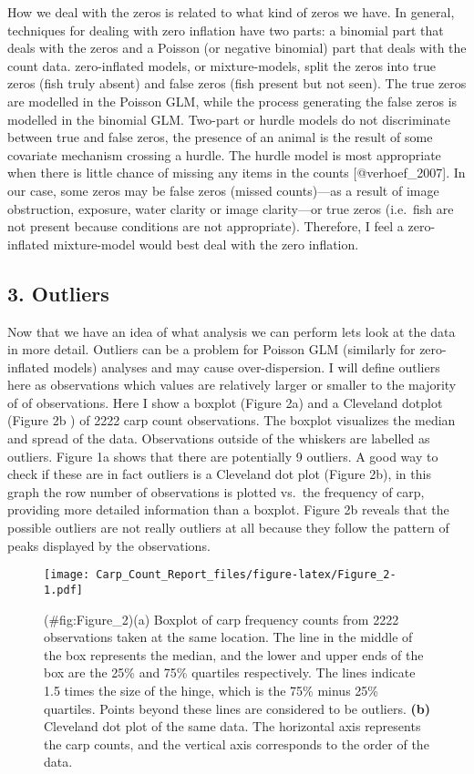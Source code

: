 \documentclass[]{article}
\begin{document}
How we deal with the zeros is related to what kind of zeros we have. In
general, techniques for dealing with zero inflation have two parts: a
binomial part that deals with the zeros and a Poisson (or negative
binomial) part that deals with the count data. zero-inflated models, or
mixture-models, split the zeros into true zeros (fish truly absent) and
false zeros (fish present but not seen). The true zeros are modelled in
the Poisson GLM, while the process generating the false zeros is
modelled in the binomial GLM. Two-part or hurdle models do not
discriminate between true and false zeros, the presence of an animal is
the result of some covariate mechanism crossing a hurdle. The hurdle
model is most appropriate when there is little chance of missing any
items in the counts {[}@verhoef\_2007{]}. In our case, some zeros may be
false zeros (missed counts)---as a result of image obstruction,
exposure, water clarity or image clarity---or true zeros (i.e.~fish are
not present because conditions are not appropriate). Therefore, I feel a
zero-inflated mixture-model would best deal with the zero inflation.

\subsection{3. Outliers}\label{outliers}

Now that we have an idea of what analysis we can perform lets look at
the data in more detail. Outliers can be a problem for Poisson GLM
(similarly for zero-inflated models) analyses and may cause
over-dispersion. I will define outliers here as observations which
values are relatively larger or smaller to the majority of of
observations. Here I show a boxplot (Figure 2a) and a Cleveland dotplot
(Figure 2b ) of 2222 carp count observations. The boxplot visualizes the
median and spread of the data. Observations outside of the whiskers are
labelled as outliers. Figure 1a shows that there are potentially 9
outliers. A good way to check if these are in fact outliers is a
Cleveland dot plot (Figure 2b), in this graph the row number of
observations is plotted vs.~the frequency of carp, providing more
detailed information than a boxplot. Figure 2b reveals that the possible
outliers are not really outliers at all because they follow the pattern
of peaks displayed by the observations.

\begin{figure}[htbp]
\centering
\texttt{[image: Carp\_Count\_Report\_files/figure-latex/Figure\_2-1.pdf]}
\caption{(\#fig:Figure\_2)(a) Boxplot of carp frequency counts from 2222
observations taken at the same location. The line in the middle of the
box represents the median, and the lower and upper ends of the box are
the 25\% and 75\% quartiles respectively. The lines indicate 1.5 times
the size of the hinge, which is the 75\% minus 25\% quartiles. Points
beyond these lines are considered to be outliers. \textbf{(b)} Cleveland
dot plot of the same data. The horizontal axis represents the carp
counts, and the vertical axis corresponds to the order of the data.}
\end{figure}
\end{document}
